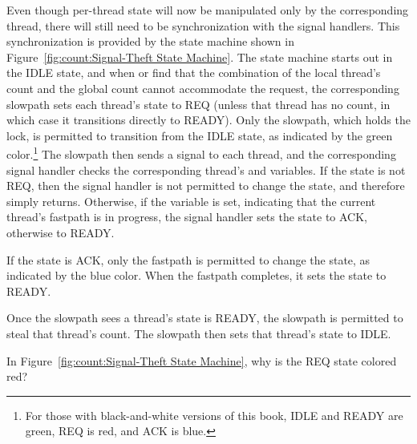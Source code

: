 Even though per-thread state will now be manipulated only by the
corresponding thread, there will still need to be synchronization
with the signal handlers.
This synchronization is provided by the state machine shown in
Figure~\ref{fig:count:Signal-Theft State Machine}.
The state machine starts out in the IDLE state, and when 
or  find that the combination of the local thread's count
and the global count cannot accommodate the request, the corresponding
slowpath sets each thread's  state to REQ (unless that thread
has no count, in which case it transitions directly to READY).
Only the slowpath, which holds the  lock, is permitted to
transition from the IDLE state, as indicated by the green color.\footnote{
	For those with black-and-white versions of this book,
	IDLE and READY are green, REQ is red, and ACK is blue.}
The slowpath then sends a signal to each thread, and the corresponding
signal handler checks the corresponding thread's  and
 variables.
If the  state is not REQ, then the signal handler is not
permitted to change the state, and therefore simply returns.
Otherwise, if the  variable is set, indicating that
the current thread's fastpath is in progress, the signal handler
sets the  state to ACK, otherwise to READY.

If the  state is ACK,
only the fastpath is permitted to change
the  state, as indicated by the blue color.
When the fastpath completes, it sets the  state to READY.

Once the slowpath sees a thread's  state is READY, the
slowpath is permitted to steal that thread's count.
The slowpath then sets that thread's  state to IDLE.

\QuickQuiz{}
	In Figure~\ref{fig:count:Signal-Theft State Machine}, why is
	the REQ  state colored red?
 \QuickQuizEnd

